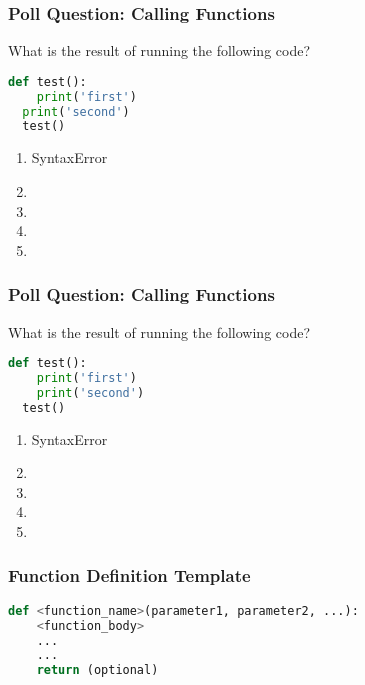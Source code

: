 \documentclass{beamer}
\begin{document}
%
%
\begin{frame}[fragile]
  \frametitle{Poll Question: Calling Functions}
  What is the result of running the following code?
  \begin{lstlisting}[language=Python, autogobble]
  def test():
    print('first')
  print('second')
  test()
  \end{lstlisting}
  \vfill
  \begin{enumerate}[A]
    \item SyntaxError
    \item {}
    \item {}
    \item {}
    \item {} %
  \end{enumerate}
\end{frame}

%
%
\begin{frame}[fragile]
  \frametitle{Poll Question: Calling Functions}
  What is the result of running the following code?
  \begin{lstlisting}[language=Python, autogobble]
  def test():
    print('first')
    print('second')
  test()
  \end{lstlisting}
  \vfill
  \begin{enumerate}[A]
    \item SyntaxError
    \item {}
    \item {}
    \item {}
    \item {} %
  \end{enumerate}
\end{frame}


%
%
\begin{frame}[fragile]
  \frametitle{Function Definition Template}
  \begin{lstlisting}[language=Python, autogobble]
  def <function_name>(parameter1, parameter2, ...):
    <function_body>
    ...
    ...
    return (optional)
  \end{lstlisting}
\end{frame}
\end{document}
